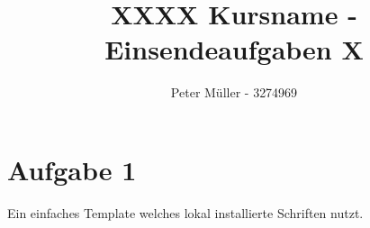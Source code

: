 \documentclass{article}
\title{XXXX Kursname - Einsendeaufgaben X}
\author{Peter Müller - 3274969}
\begin{document}
\setlength{\baselineskip}{1.5em}
\setlength{\parindent}{0em}
\setlength{\parskip}{1em}

\maketitle

\newpage

\section*{Aufgabe 1}

Ein einfaches Template welches lokal installierte Schriften nutzt.
\end{document}
